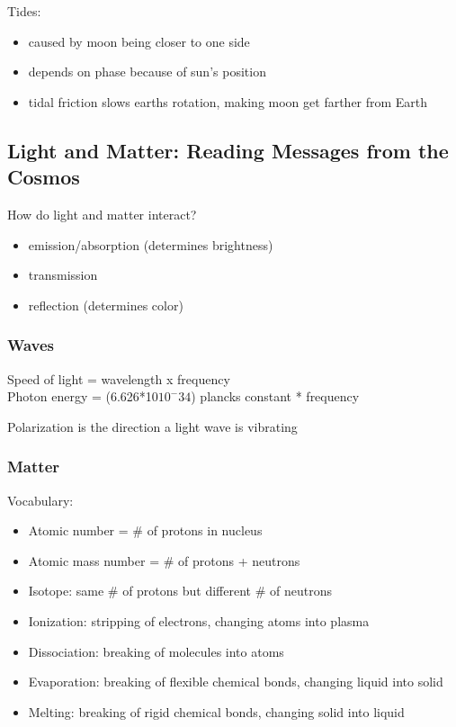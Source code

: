 \documentclass[12pt]{article}
\begin{document}
Tides:
\begin{itemize}
    \item caused by moon being closer to one side
    \item depends on phase because of sun's position
    \item tidal friction slows earths rotation, making moon get farther from Earth
\end{itemize}

\subsection{Light and Matter: Reading Messages from the Cosmos}
How do light and matter interact?
\begin{itemize}
    \item emission/absorption (determines brightness)
    \item transmission
    \item reflection (determines color)
\end{itemize}

\subsubsection{Waves}
Speed of light = wavelength x frequency\\
Photon energy = (6.626*10$10^-34$) plancks constant * frequency

Polarization is the direction a light wave is vibrating

\subsubsection{Matter}
Vocabulary:
\begin{itemize}
    \item Atomic number = \# of protons in nucleus
    \item Atomic mass number = \# of protons + neutrons
    \item Isotope: same \# of protons but different \# of neutrons
    \item Ionization: stripping of electrons, changing atoms into plasma
    \item Dissociation: breaking of molecules into atoms
    \item Evaporation: breaking of flexible chemical bonds, changing liquid into solid
    \item Melting: breaking of rigid chemical bonds, changing solid into liquid
\end{itemize}
\end{document}
